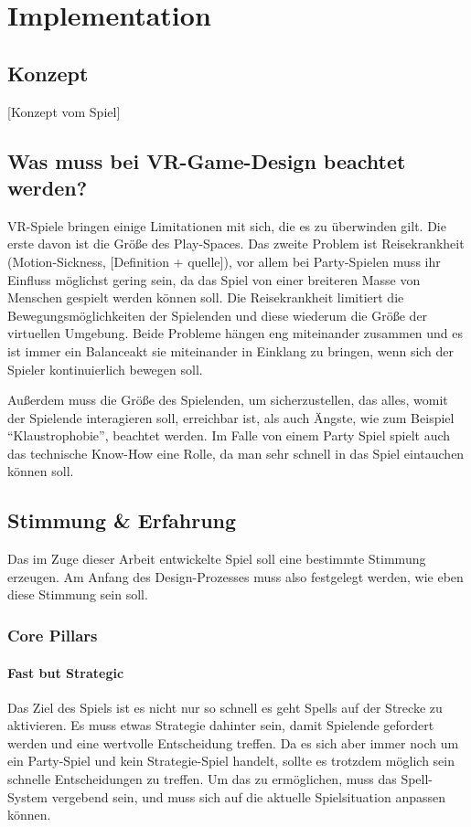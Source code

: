 \chapter{Implementation}

\section{Konzept}

[Konzept vom Spiel]

\section{Was muss bei VR-Game-Design beachtet werden?}

VR-Spiele bringen einige Limitationen mit sich, die es zu überwinden gilt. Die erste davon ist die Größe des Play-Spaces. Das zweite Problem ist Reisekrankheit (Motion-Sickness, [Definition + quelle]), vor allem bei Party-Spielen muss ihr Einfluss möglichst gering sein, da das Spiel von einer breiteren Masse von Menschen gespielt werden können soll. Die Reisekrankheit limitiert die Bewegungsmöglichkeiten der Spielenden und diese wiederum die Größe der virtuellen Umgebung. Beide Probleme hängen eng miteinander zusammen und es ist immer ein Balanceakt sie miteinander in Einklang zu bringen, wenn sich der Spieler kontinuierlich bewegen soll. 

Außerdem muss die Größe des Spielenden, um sicherzustellen, das alles, womit der Spielende interagieren soll, erreichbar ist, als auch Ängste, wie zum Beispiel "`Klaustrophobie"', beachtet werden. Im Falle von einem Party Spiel spielt auch das technische Know-How eine Rolle, da man sehr schnell in das Spiel eintauchen können soll.

\section{Stimmung \& Erfahrung}

Das im Zuge dieser Arbeit entwickelte Spiel soll eine bestimmte Stimmung erzeugen. Am Anfang des Design-Prozesses muss also festgelegt werden, wie eben diese Stimmung sein soll.

\subsection{Core Pillars}

\subsubsection{Fast but Strategic}
Das Ziel des Spiels ist es nicht nur so schnell es geht Spells auf der Strecke zu aktivieren. Es muss etwas Strategie dahinter sein, damit Spielende gefordert werden und eine wertvolle Entscheidung treffen. Da es sich aber immer noch um ein Party-Spiel und kein Strategie-Spiel handelt, sollte es trotzdem möglich sein schnelle Entscheidungen zu treffen. Um das zu ermöglichen, muss das Spell-System vergebend sein, und muss sich auf die aktuelle Spielsituation anpassen können. 

